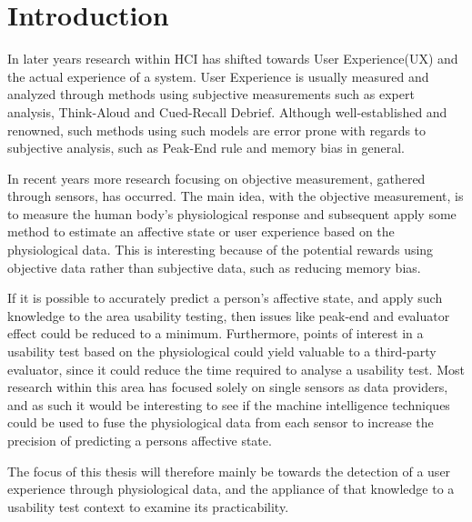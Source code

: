 \chapter{Introduction}
In later years research within HCI has shifted towards User Experience(UX) and the actual experience of a system.
User Experience is usually measured and analyzed through methods using subjective measurements such as expert analysis, Think-Aloud and Cued-Recall Debrief.
Although well-established and renowned, such methods using such models are error prone with regards to subjective analysis, such as Peak-End rule\cite{cockburn_peakend} and memory bias in general.

In recent years more research focusing on objective measurement, gathered through sensors, has occurred. 
The main idea, with the objective measurement, is to measure the human body's physiological response and subsequent apply some method to estimate an affective state or user experience based on the physiological data.
This is interesting because of the potential rewards using objective data rather than subjective data, such as reducing memory bias.

If it is possible to accurately predict a person's affective state, and apply such knowledge to the area usability testing, then issues like peak-end and evaluator effect\cite{eval_effect_research} could be reduced to a minimum.
Furthermore, points of interest in a usability test based on the physiological could yield valuable to a third-party evaluator, since it could reduce the time required to analyse a usability test.
Most research within this area has focused solely on single sensors as data providers, and as such it would be
interesting to see if the machine intelligence techniques could be used to fuse the physiological data from each sensor to increase the precision of predicting a persons affective state.

The focus of this thesis will therefore mainly be towards the detection of a user experience through physiological data, and the appliance of that knowledge to a usability test context to examine its practicability.